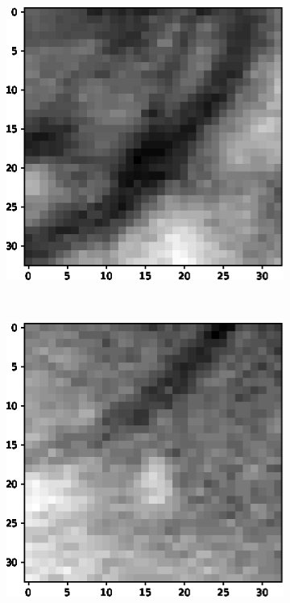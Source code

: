 \documentclass[aps,prb,10pt,twocolumn,groupedaddress]{revtex4-1}
\begin{document}
\begin{figure}[!t]
\begin{subfigure}[]{0.3\textwidth}
		\caption{}
	\end{subfigure}
	\hspace{0.5cm}
	\centering
	\begin{subfigure}[]{0.3\textwidth}
		\centering
		\includegraphics[width=\textwidth]{images/positive3.eps}
		\caption{}
	\end{subfigure}\\
	\vspace{0.5cm}
	\centering
	\begin{subfigure}[]{0.3\textwidth}
		\centering
		\includegraphics[width=\textwidth]{images/negative1.eps}

\end{subfigure}
\end{figure}
\end{document}
